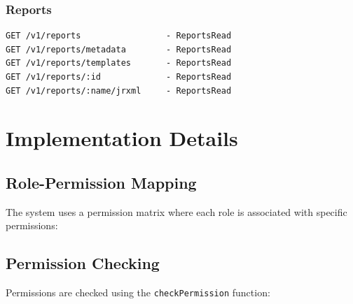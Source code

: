 \subsubsection{Reports}\label{reports}

\begin{verbatim}
GET /v1/reports                 - ReportsRead
GET /v1/reports/metadata        - ReportsRead
GET /v1/reports/templates       - ReportsRead
GET /v1/reports/:id             - ReportsRead
GET /v1/reports/:name/jrxml     - ReportsRead
\end{verbatim}

\section{Implementation Details}\label{implementation-details}

\subsection{Role-Permission Mapping}\label{role-permission-mapping}

The system uses a permission matrix where each role is associated with
specific permissions:

\begin{Shaded}
\begin{Highlighting}[]
  \OtherTok{=} 
\NormalTok{  \{} 
\NormalTok{  ,}\NormalTok{ [}\NormalTok{]}
\NormalTok{  \}}
\end{Highlighting}
\end{Shaded}

\subsection{Permission Checking}\label{permission-checking}

Permissions are checked using the \texttt{checkPermission} function:

\begin{Shaded}
\begin{Highlighting}[]
  \OtherTok{{-}\textgreater{}}  \OtherTok{{-}\textgreater{}}  \NormalTok{ ()}
\end{Highlighting}
\end{Shaded}

